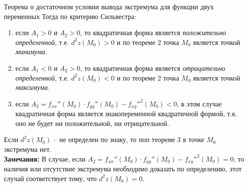\begin{tbox}{Теорема о достаточном условии вывода экстремума для функции двух переменных}
	Тогда по критерию Сильвестра:
	\begin{enumerate}
		\item если $A_1 > 0$ и $A_2 > 0$, то квадратичная форма является \textit{положительно определенной}, т.е. $d^2 z(M_0) > 0$ и по теореме 2 точка $M_0$ является точкой \textit{минимума}.
		\item если $A_1 < 0$ и $A_2 > 0$, то квадратичная форма является \textit{отрицательно определенной}, т.е. $d^2 z(M_0) < 0$ и по теореме 2 точка $M_0$ является точкой \textit{максимума}.
		\item если $A_2 = f_{xx}''(M_0) \cdot f_{yy}''(M_0) - {f_{xy}''}^2(M_0) < 0$, в этом случае квадратичная форма является знакопеременной квадратичной формой, т.к. оно не будет ни положительной, ни отрицательной.
	\end{enumerate}

	Если $d^2 z (M_0)$ -- не определен по знаку, то поп теореме 3 в точке $M_0$ экстремума нет. \\

	\textbf{Замечания: } В случае, если $A_2 = f_{xx}''(M_0) \cdot f_{yy}''(M_0) - {f_{xy}''}^2(M_0) = 0$, то наличия или отсутствие экстремума необходимо доказать по определению, этот случай соответствует тому, что $d^2 z(M_0) = 0$.
\end{tbox}